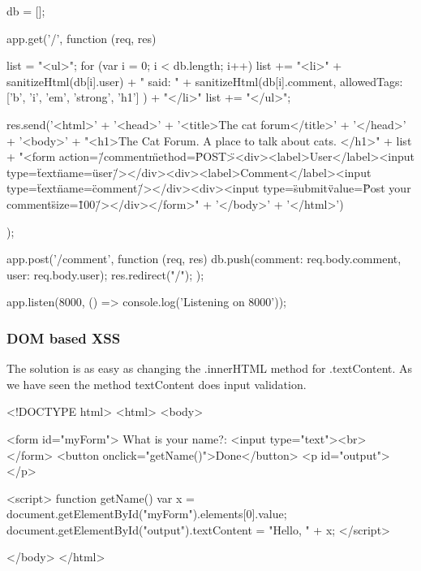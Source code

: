\begin{Answer}[ref={websec-xss-prevention}]
\begin{js}
db = [];

app.get('/', function (req, res) {
  list = "<ul>";
  for (var i = 0; i < db.length; i++) {
    list += "<li>" + sanitizeHtml(db[i].user) + " said: " + sanitizeHtml(db[i].comment, {
      allowedTags: ['b', 'i', 'em', 'strong', 'h1']
    }) + "</li>"
  }
  list += "</ul>";
  
  res.send('<html>' +
    '<head>' +
    '<title>The cat forum</title>' +
    '</head>' +
    '<body>' +
    "<h1>The Cat Forum. A place to talk about cats. </h1>" +
    list +
    "<form action=\"/comment\" method=\"POST\"><div><label>User</label><input type=\"text\" name=\"user\"/></div><div><label>Comment</label><input type=\"text\" name=\"comment\"/></div><div><input type=\"submit\" value=\"Post your comment\" size=\"100\"/></div></form>" +
    '</body>' +
  '</html>')
});

app.post('/comment', function (req, res) {
  db.push({comment: req.body.comment, user: req.body.user});
  res.redirect("/");
});

app.listen(8000, () => console.log('Listening on 8000'));
\end{js}
\subsubsection{DOM based XSS}
The solution is as easy as changing the .innerHTML method for .textContent. As we have seen the method textContent does input validation.
\begin{html}
<!DOCTYPE html>
<html>
<body>

  <form id="myForm">
    What is your name?: <input type="text"><br>
  </form>
  <button onclick="getName()">Done</button>
  <p id="output"></p>
  
  <script>
  function getName(){
    var x = document.getElementById("myForm").elements[0].value;
    document.getElementById("output").textContent = "Hello, " + x;
  }
  </script>

</body>
</html>
\end{html}
\end{Answer}